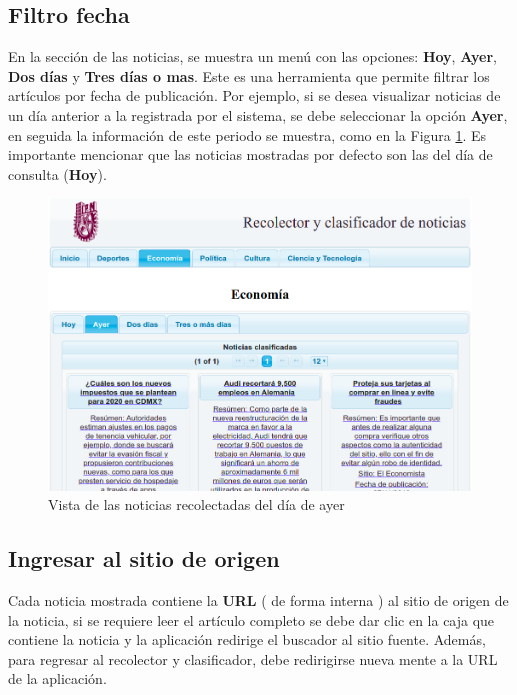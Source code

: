 \subsection{Filtro fecha}

En la sección de las noticias, se muestra un menú con las opciones: \textbf{Hoy}, \textbf{Ayer}, \textbf{Dos días} y \textbf{Tres días o mas}. Este es una herramienta que permite filtrar los artículos por fecha de publicación. Por ejemplo, si se desea visualizar noticias de un día anterior a la registrada por el sistema, se debe seleccionar la opción \textbf{Ayer}, en seguida la información de este periodo se muestra, como en la Figura \ref{fig:vistaNoticiasAyer}. Es importante mencionar que las noticias mostradas por defecto son las del día de consulta (\textbf{Hoy}).



\begin{figure}[H]
\centering
\includegraphics[scale=0.45]{imagenes/noticiasDeAyer.png}
\caption{Vista de las noticias recolectadas del día de ayer}
\label{fig:vistaNoticiasAyer}
\end{figure}


\subsection{Ingresar al sitio de origen}

Cada noticia mostrada contiene la \textbf{URL} ( de forma interna ) al sitio de origen de la noticia, si se requiere  leer el artículo completo se debe dar clic en la caja que contiene la noticia y la aplicación redirige el buscador al sitio fuente. Además, para regresar al recolector y clasificador, debe redirigirse nueva mente a la URL de la aplicación.

